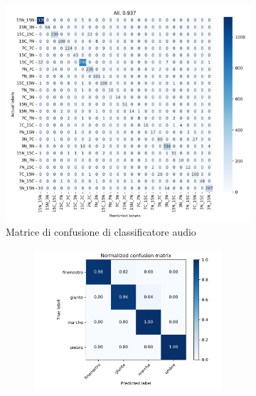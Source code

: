 \begin{figure}[h]
    \begin{minipage}{\textwidth}
        \centering
        \begin{subfigure}{0.8\textwidth}
            \centering
            \includegraphics[width=\textwidth]{img/confusion-matrix-audio-classification.png}
            \caption{Matrice di confusione di classificatore audio \cite[fig. 3.8]{spanioStudyEqualizationCurve2023}}
            \label{fig:confusion-matrix-audio-classification}
        \end{subfigure}
        \par\bigskip
        \begin{subfigure}{0.9\textwidth}
            \centering
            \begin{subfigure}{0.49\textwidth}
                \centering
                \includegraphics[width=\textwidth]{img/confusion-matrix-video-classification-7dot5ips-tape.png}

\end{subfigure}
\end{subfigure}
\end{minipage}
\end{figure}
